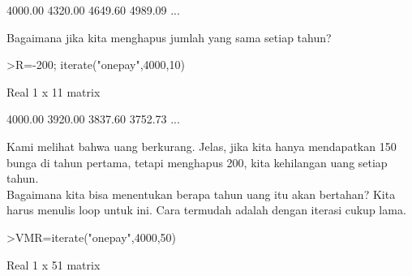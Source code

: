 \documentclass[a4paper,10pt]{article}
\begin{document}
\begin{eulernotebook}
\begin{eulercomment}
\begin{eulercomment}
\begin{eulercomment}
\begin{eulercomment}
\begin{euleroutput}
      4000.00     4320.00     4649.60     4989.09     ...
\end{euleroutput}
\begin{eulercomment}
Bagaimana jika kita menghapus jumlah yang sama setiap tahun?
\end{eulercomment}
\begin{eulerprompt}
>R=-200; iterate("onepay",4000,10)
\end{eulerprompt}
\begin{euleroutput}
  Real 1 x 11 matrix
  
      4000.00     3920.00     3837.60     3752.73     ...
\end{euleroutput}
\begin{eulercomment}
Kami melihat bahwa uang berkurang. Jelas, jika kita hanya mendapatkan
150 bunga di tahun pertama, tetapi menghapus 200, kita kehilangan uang
setiap tahun.\\
Bagaimana kita bisa menentukan berapa tahun uang itu akan bertahan?
Kita harus menulis loop untuk ini. Cara termudah adalah dengan iterasi
cukup lama.
\end{eulercomment}
\begin{eulerprompt}
>VMR=iterate("onepay",4000,50)
\end{eulerprompt}
\begin{euleroutput}
  Real 1 x 51 matrix
  

\end{euleroutput}
\end{eulercomment}
\end{eulercomment}
\end{eulercomment}
\end{eulercomment}
\end{eulernotebook}
\end{document}
